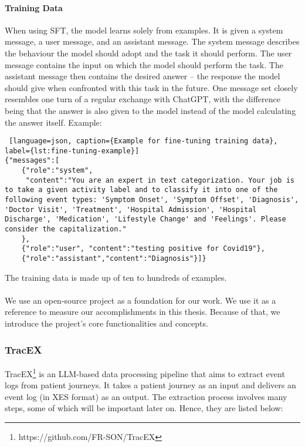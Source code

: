\paragraph{Training Data}
When using SFT, the model learns solely from examples. It is given a system message, a user message, and an assistant message. The system message describes the behaviour the model should adopt and the task it should perform. The user message contains the input on which the model should perform the task. The assistant message then contains the desired answer – the response the model should give when confronted with this task in the future.
One message set closely resembles one turn of a regular exchange with ChatGPT, with the difference being that the answer is also given to the model instead of the model calculating the answer itself.
Example:
\begin{lstlisting} [language=json, caption={Example for fine-tuning training data}, label={lst:fine-tuning-example}]   
{"messages":[
    {"role":"system",
     "content":"You are an expert in text categorization. Your job is to take a given activity label and to classify it into one of the following event types: 'Symptom Onset', 'Symptom Offset', 'Diagnosis', 'Doctor Visit', 'Treatment', 'Hospital Admission', 'Hospital Discharge', 'Medication', 'Lifestyle Change' and 'Feelings'. Please consider the capitalization."
    },
    {"role":"user", "content":"testing positive for Covid19"},
    {"role":"assistant","content":"Diagnosis"}]}
\end{lstlisting}
The training data is made up of ten to hundreds of examples.\\\\
We use an open-source project as a foundation for our work. We use it as a reference to measure our accomplishments in this thesis. Because of that, we introduce the project's core functionalities and concepts.

\subsubsection*{TracEX}\label{sec:tracex}
TracEX\footnote{https://github.com/FR-SON/TracEX} is an LLM-based data processing pipeline that aims to extract event logs from patient journeys. It takes a patient journey as an input and delivers an event log (in XES format) as an output. The extraction process involves many steps, some of which will be important later on. Hence, they are listed below:
